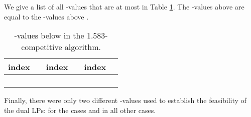 We give a list of all -values that are at most  in Table \ref{tab:sh-deltas}. The -values above  are equal to the -values above .
\begin{table}
	\centering
\begin{tabular}{|c|c||c|c||c|c|}\hline
	index  &  & index  &  & index  &  \\ \hline
	 &  &  &  &  &  \\ \hline
	 &  &  &  &  &  \\ \hline
	 &  &  &  &  &  \\ \hline
	 &  &  &  &  &  \\ \hline
\end{tabular}
	\caption{-values below  in the 1.583-competitive algorithm.\label{tab:sh-deltas}}
\end{table}
Finally, there were only two different -values used to establish the feasibility of the dual LPs:  for the cases  and  in all other cases.

